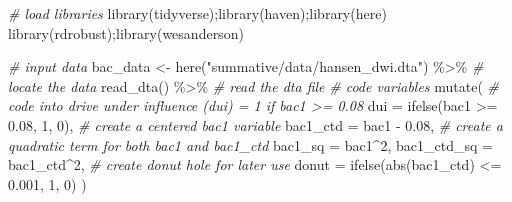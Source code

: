 \documentclass[
  11pt,
]{article}
\newenvironment{Shaded}{\begin{snugshade}}{\end{snugshade}}
\newcommand{\AttributeTok}[1]{\textcolor[rgb]{0.77,0.63,0.00}{#1}}
\newcommand{\CommentTok}[1]{\textcolor[rgb]{0.56,0.35,0.01}{\textit{#1}}}
\newcommand{\DecValTok}[1]{\textcolor[rgb]{0.00,0.00,0.81}{#1}}
\newcommand{\FloatTok}[1]{\textcolor[rgb]{0.00,0.00,0.81}{#1}}
\newcommand{\FunctionTok}[1]{\textcolor[rgb]{0.00,0.00,0.00}{#1}}
\newcommand{\NormalTok}[1]{#1}
\newcommand{\OtherTok}[1]{\textcolor[rgb]{0.56,0.35,0.01}{#1}}
\newcommand{\SpecialCharTok}[1]{\textcolor[rgb]{0.00,0.00,0.00}{#1}}
\newcommand{\StringTok}[1]{\textcolor[rgb]{0.31,0.60,0.02}{#1}}
\begin{document}
\begin{Shaded}
\begin{Highlighting}[]
\CommentTok{\# load libraries}
\FunctionTok{library}\NormalTok{(tidyverse);}\FunctionTok{library}\NormalTok{(haven);}\FunctionTok{library}\NormalTok{(here)}
\FunctionTok{library}\NormalTok{(rdrobust);}\FunctionTok{library}\NormalTok{(wesanderson)}

\CommentTok{\# input data}
\NormalTok{bac\_data }\OtherTok{\textless{}{-}}
  \FunctionTok{here}\NormalTok{(}\StringTok{"summative/data/hansen\_dwi.dta"}\NormalTok{) }\SpecialCharTok{\%\textgreater{}\%} \CommentTok{\# locate the data}
  \FunctionTok{read\_dta}\NormalTok{() }\SpecialCharTok{\%\textgreater{}\%} \CommentTok{\# read the dta file}
  \CommentTok{\# code variables}
  \FunctionTok{mutate}\NormalTok{(}
    \CommentTok{\# code into drive under influence (dui) = 1 if bac1 \textgreater{}= 0.08}
    \AttributeTok{dui =} \FunctionTok{ifelse}\NormalTok{(bac1 }\SpecialCharTok{\textgreater{}=} \FloatTok{0.08}\NormalTok{, }\DecValTok{1}\NormalTok{, }\DecValTok{0}\NormalTok{),}
    \CommentTok{\# create a centered bac1 variable}
    \AttributeTok{bac1\_ctd =}\NormalTok{ bac1 }\SpecialCharTok{{-}} \FloatTok{0.08}\NormalTok{,}
    \CommentTok{\# create a quadratic term for both bac1 and bac1\_ctd}
    \AttributeTok{bac1\_sq =}\NormalTok{ bac1}\SpecialCharTok{\^{}}\DecValTok{2}\NormalTok{,}
    \AttributeTok{bac1\_ctd\_sq =}\NormalTok{ bac1\_ctd}\SpecialCharTok{\^{}}\DecValTok{2}\NormalTok{,}
    \CommentTok{\# create donut hole for later use}
    \AttributeTok{donut =} \FunctionTok{ifelse}\NormalTok{(}\FunctionTok{abs}\NormalTok{(bac1\_ctd) }\SpecialCharTok{\textless{}=} \FloatTok{0.001}\NormalTok{, }\DecValTok{1}\NormalTok{, }\DecValTok{0}\NormalTok{)}
\NormalTok{    )}


\end{Highlighting}
\end{Shaded}
\end{document}
